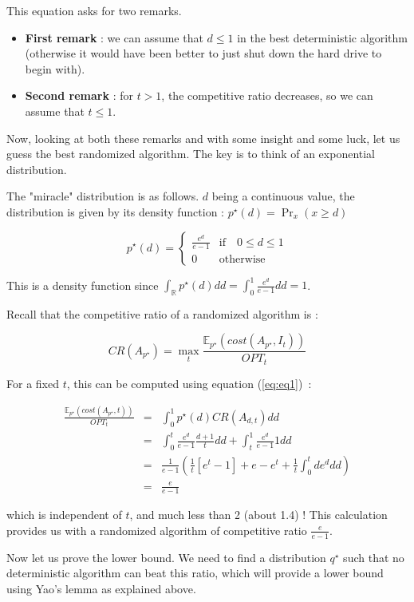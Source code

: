 \documentclass[a4paper,11pt]{article}
\begin{document}
This equation asks for two remarks.
\begin{itemize}
\item \textbf{First remark} : we can assume that $d \leq 1$ in the best deterministic algorithm (otherwise it would have been better to just shut down the hard drive to begin with).
\item \textbf{Second remark} : for $t >1$, the competitive ratio decreases, so we can assume that $t \leq 1$.
\end{itemize}

Now, looking at both these remarks and with some insight and some luck, let us guess the best randomized algorithm. The key is to think of an exponential distribution.

The "miracle" distribution is as follows. $d$ being a continuous value, the distribution is given by its density function : $p^\star(d) = \Pr_x(x \geq d)$

$$p^\star(d)= \left\{\begin{array}{ll} \frac{e^d}{e-1} & \text{if} \quad 0 \leq d \leq 1\\ 0 & \text{otherwise}\end{array}\right.$$

This is a density function since $\int_{\mathbb{R}} p^\star(d) d d = \int_0^1 \frac{e^d}{e-1}dd =1$.

Recall that the competitive ratio of a randomized algorithm is :

\[CR(A_{p^\star}) = \max_{t} \frac{ \mathbb{E}_{p^\star}(cost(A_{p^\star},I_t))}{OPT_t} \]


For a fixed $t$, this can be computed using equation (\ref{eq:eq1})~:

\begin{eqnarray*}
\frac{ \mathbb{E}_{p^\star}(cost(A_{p^\star},t))}{OPT_t}&=&\int_0^1 p^\star(d) CR(A_{d,t}) dd \\
&=& \int_0^t \frac{e^d}{e-1} \frac{d+1}{t}dd + \int_t^1 \frac{e^d}{e-1} 1 dd \\
&=& \frac{1}{e-1} ( \frac{1}{t} [e^t-1] + e-e^t + \frac{1}{t}\int_0^t de^d dd) \\
&=& \frac{e}{e-1}
\end{eqnarray*}

which is independent of $t$, and much less than 2 (about 1.4) ! This calculation provides us with a randomized algorithm of competitive ratio $\frac{e}{e-1}$.

\medskip

Now let us prove the lower bound. We need to find a distribution $q^\star$ such that no deterministic algorithm can beat this ratio, which will provide a lower bound using Yao's lemma as explained above.
\end{document}
